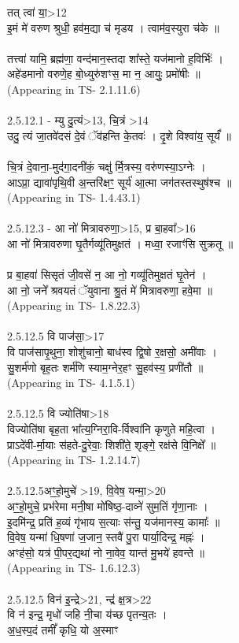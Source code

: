 \documentclass[17pt]{extarticle}
\begin{document}
तत् त्वा॑ या॒>12\\इ॒मं मे॑ वरुण श्रुधी॒ हव॑म॒द्या च॑ मृडय । त्वाम॑व॒स्युरा च॑के ॥\\\\तत्त्वा॑ यामि॒ ब्रह्म॑णा॒ वन्द॑मान॒स्तदा शा᳚स्ते॒ यज॑मानो ह॒विर्भिः॑ । \\अहे॑डमानो वरुणे॒ह बो॒ध्युरु॑शꣳस॒ मा न॒ आयुः॒ प्रमो॑षीः ॥\\(Appearing in TS- 2.1.11.6)\\\\2.5.12.1 - म्यु दु॒त्यं>13, चि॒त्रं >14\\उदु॒ त्यं जा॒तवे॑दसं दे॒वं ॅव॑हन्ति के॒तवः॑ । दृ॒शे विश्वा॑य॒ सूर्यं᳚ ॥\\\\चि॒त्रं दे॒वाना॒-मुद॑गा॒दनी॑कं॒ चक्षु॑ र्मि॒त्रस्य॒ वरु॑णस्या॒ऽग्नेः ।\\आऽप्रा॒ द्यावा॑पृथि॒वी अ॒न्तरि॑क्षꣳ॒॒ सूर्य॑ आ॒त्मा जग॑तस्तस्थुष॑श्च ॥\\(Appearing in TS- 1.4.43.1)\\\\2.5.12.3 - आ नो॑ मित्रावरुणा॒>15, प्र बा॒हवा᳚>16\\आ नो॑ मित्रावरुणा घृ॒तैर्गव्यू॑तिमुक्षतं । मध्वा॒ रजाꣳ॑सि सुक्रतू ॥\\\\प्र बा॒हवा॑ सिसृतं जी॒वसे॑ न॒ आ नो॒ गव्यू॑तिमुक्षतं घृ॒तेन॑ । \\आ नो॒ जने᳚ श्रवयतं ॅयुवाना श्रु॒तं मे॑ मित्रावरुणा॒ हवे॒मा ॥\\(Appearing in TS- 1.8.22.3)\\\\2.5.12.5 वि पाज॑सा॒>17\\वि पाज॑सापृ॒थुना॒ शोशु॑चानो॒ बाध॑स्व द्वि॒षो र॒क्षसो॒ अमी॑वाः ।\\सु॒शर्म॑णो बृह॒तः शर्म॑णि स्याम॒ग्नेर॒हꣳ सु॒हव॑स्य॒ प्रणी॑तौ ॥\\(Appearing in TS- 4.1.5.1)\\\\2.5.12.5 वि ज्योति॑षा>18\\विज्योति॑षा बृह॒ता भा᳚त्य॒ग्निरा॒वि-र्विश्वा॑नि कृणुते महि॒त्वा ।\\प्राऽदे॑वी-र्मा॒याः स॑हते-दु॒रेवाः॒ शिशी॑ते॒ शृङ्गे॒ रक्ष॑से वि॒निक्षे᳚ ॥\\(Appearing in TS- 1.2.14.7)\\\\2.5.12.5अꣳ॒॒हो॒मुचे॑ >19, वि॒वेष॒ यन्मा॒>20\\अꣳ॒॒हो॒मुचे॒ प्रभ॑रेमा मनी॒षा मो॑षिष्ठ॒-दाव्ने॑ सुम॒तिं गृ॑णा॒नाः । \\इ॒दमि॑न्द्र॒ प्रति॑ ह॒व्यं गृ॑भाय स॒त्याः स॑न्तु॒ यज॑मानस्य॒ कामाः᳚ ॥ \\वि॒वेष॒ यन्मा॑ धि॒षणा॑ ज॒जान॒ स्तवै॑ पु॒रा पार्या॒दिन्द्र॒ मह्नः॑ । \\अꣳह॑सो॒ यत्र॑ पी॒पर॒द्यथा॑ नो ना॒वेव॒ यान्त॑ मु॒भये॑ हवन्ते ॥ \\(Appearing in TS- 1.6.12.3)\\\\2.5.12.5 विन॑ इ॒न्द्रे>21, न्द्र॑ क्ष॒त्र>22\\वि न॑ इन्द्र॒ मृधो॑ जहि नी॒चा य॑च्छ पृतन्य॒तः । \\अ॒ध॒स्प॒दं तमीं᳚ कृधि॒ यो अ॒स्माꣳ 
\end{document}

